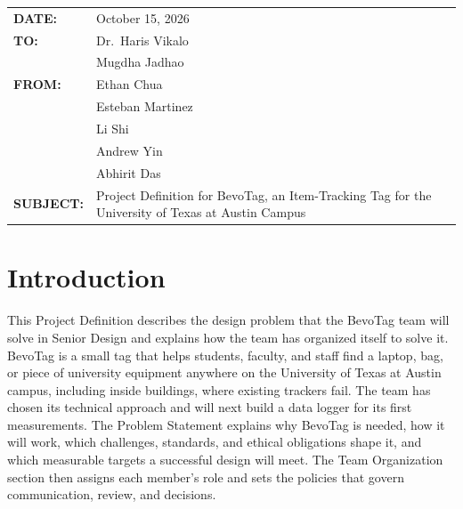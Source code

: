 \documentclass[12pt,letterpaper]{article}
\begin{document}
\thispagestyle{empty}

\begingroup
{}
\newcommand{\fieldgap}{\\[6.2pt]}
\noindent\begin{tabular}{@{}p{1.1in}@{}p{\dimexpr\linewidth-1.1in\relax}@{}}
\textbf{DATE:} & October 15, 2026 \fieldgap
\textbf{TO:} & Dr.\ Haris Vikalo \\ & Mugdha Jadhao \fieldgap
\textbf{FROM:} & Ethan Chua \\ & Esteban Martinez \\ & Li Shi \\ & Andrew Yin \\ & Abhirit Das \fieldgap
\textbf{SUBJECT:} & Project Definition for BevoTag, an Item-Tracking Tag for the University of Texas at
Austin Campus \\
\end{tabular}
\endgroup

\section{Introduction}
This Project Definition describes the design problem that the BevoTag team will solve in Senior
Design and explains how the team has organized itself to solve it. BevoTag is a small tag that helps
students, faculty, and staff find a laptop, bag, or piece of university equipment anywhere on the
University of Texas at Austin campus, including inside buildings, where existing trackers fail. The
team has chosen its technical approach and will next build a data logger for its first
measurements. The Problem Statement explains why BevoTag is needed, how it will work, which
challenges, standards, and ethical obligations shape it, and which measurable targets a successful
design will meet. The Team Organization section then assigns each member's role and sets the
policies that govern communication, review, and decisions.
\end{document}
